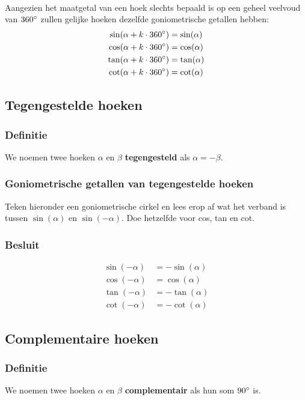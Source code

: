 \documentclass[a4paper,12pt]{article}
\begin{document}
\paragraph{}
Aangezien het maatgetal van een hoek slechts bepaald is op een geheel veelvoud van $360^\circ$ zullen gelijke hoeken dezelfde goniometrische getallen hebben:
\begin{align*}
\sin(\alpha+k\cdot 360^\circ)&=\sin(\alpha)\\
\cos(\alpha+k\cdot 360^\circ)&=\cos(\alpha)\\
\tan(\alpha+k\cdot 360^\circ)&=\tan(\alpha)\\
\cot(\alpha+k\cdot 360^\circ)&=\cot(\alpha)\\
\end{align*}

\subsection{Tegengestelde hoeken}
\subsubsection*{Definitie}
We noemen twee hoeken $\alpha$ en $\beta$ \textbf{tegengesteld} als $\alpha=-\beta$.
\subsubsection*{Goniometrische getallen van tegengestelde hoeken}
Teken hieronder een goniometrische cirkel en lees erop af wat het verband is tussen $\sin(\alpha)$ en $\sin(-\alpha)$. Doe hetzelfde voor cos, tan en cot.
\vspace*{2cm}
\subsubsection*{Besluit}
\begin{align*}
  \sin(-\alpha)&=-\sin(\alpha)\\
  \cos(-\alpha)&=\cos(\alpha)\\
  \tan(-\alpha)&=-\tan(\alpha)\\
  \cot(-\alpha)&=-\cot(\alpha)
\end{align*}

\subsection{Complementaire hoeken}

\subsubsection*{Definitie}
We noemen twee hoeken $\alpha$ en $\beta$ \textbf{complementair} als hun som $90^\circ$ is.
\end{document}
